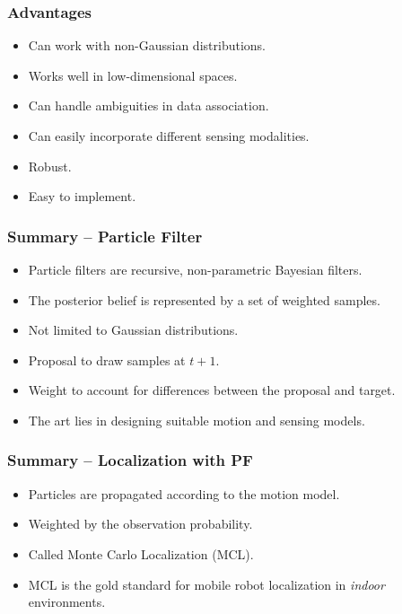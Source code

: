 \begin{frame}
    \frametitle{Advantages}
    \begin{itemize}
        \item Can work with non-Gaussian distributions.
        \item Works well in low-dimensional spaces.
        \item Can handle ambiguities in data association.
        \item Can easily incorporate different sensing modalities.
        \item Robust.
        \item Easy to implement.
    \end{itemize}
\end{frame}

\begin{frame}
    \frametitle{Summary – Particle Filter}
    \begin{itemize}
        \item Particle filters are recursive, non-parametric Bayesian filters.
        \item The posterior belief is represented by a set of weighted samples.
        \item Not limited to Gaussian distributions.
        \item Proposal to draw samples at $t+1$.
        \item Weight to account for differences between the proposal and target.
        \item The art lies in designing suitable motion and sensing models.
    \end{itemize}
\end{frame}

\begin{frame}
    \frametitle{Summary – Localization with PF}
    \begin{itemize}
        \item Particles are propagated according to the motion model.
        \item Weighted by the observation probability.
        \item Called Monte Carlo Localization (MCL).
        \item MCL is the gold standard for mobile robot localization in \emph{indoor} environments.
    \end{itemize}
\end{frame}